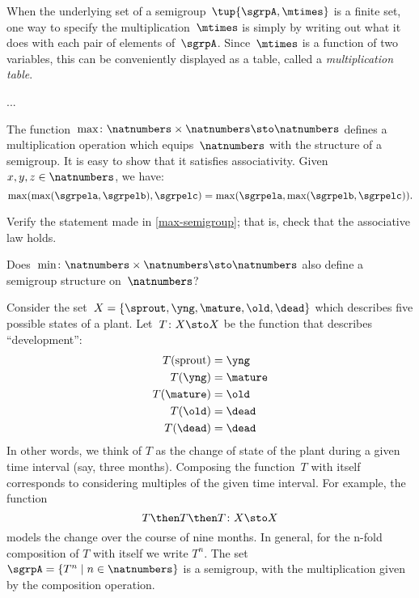 When the underlying set of a semigroup~$\tup{\sgrpA, \mtimes}$ is a finite set, one way to specify the multiplication~$\mtimes$ is simply by writing out what it does with each pair of elements of~$\sgrpA$.
Since~$\mtimes$ is a function of two variables, this can be conveniently displayed as a table, called a \emph{multiplication table}.


\begin{example}
...
\end{example}


\begin{example}
  \label{max-semigroup}
  The function~$\max \colon \natnumbers \times \natnumbers \sto \natnumbers$ defines a multiplication operation which equips~$\natnumbers$ with the structure of a semigroup.
It is easy to show that it satisfies associativity. Given~$x,y,z\in \natnumbers$, we have:
\begin{equation*}
\label{eq:max-assoc}
\max(\max(\sgrpela,\sgrpelb),\sgrpelc)=\max(\sgrpela,\max(\sgrpelb,\sgrpelc)).
\end{equation*}
\end{example}

\begin{exercise}
  \label{ex:max-semigroup}
  Verify the statement made in \cref{max-semigroup}; that is, check that the associative law holds.

  Does~$\min \colon \natnumbers \times \natnumbers \sto \natnumbers$ also define a semigroup structure on~$\natnumbers$?
\end{exercise}
\begin{solution}
\end{solution}


\begin{example}
  \label{plant-trafo-semigroup}
  Consider the set~$X = \{ \sprout, \yng, \mature, \old, \dead \}$ which describes five possible states of a plant. Let~$T \colon X \sto X$ be the function that describes ``development'':
  \begin{align*}
    T(\text{sprout}) &=  \yng \\
    T(\yng) &=  \mature \\
    T(\mature) &=  \old \\
    T( \old) &= \dead \\
    T (\dead) &= \dead
  \end{align*}
  In other words, we think of $T$ as the change of state of the plant during a given time interval (say, three months).
  Composing the function~$T$ with itself corresponds to considering multiples of the given time interval. For example, the function
  \begin{equation*}
    T \then T \then T \colon X \sto X
  \end{equation*}
  models the change over the course of nine months. In general, for the n-fold composition of $T$ with itself we write $T^n$.
  The set~$\sgrpA = \{ T^n \mid n \in \natnumbers \}$ is a semigroup, with the multiplication given by the composition operation.
\end{example}


